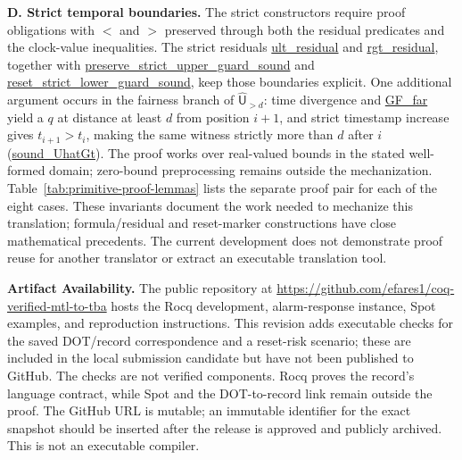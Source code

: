 \documentclass[10pt,journal,compsoc]{IEEEtran}
\newcommand{\hUntil}{\mathbin{\widehat{\mathsf{U}}}}
\newcommand{\runinhead}[1]{\par\smallskip\noindent\textbf{#1}\enspace}
\newcommand{\Rocqid}[1]{{\small\url{#1}}}
\begin{document}
\runinhead{D. Strict temporal boundaries.}
The strict constructors require proof obligations with $<$ and $>$ preserved
through both the residual predicates and the clock-value inequalities. The
strict residuals \Rocqid{ult_residual} and \Rocqid{rgt_residual}, together
with \Rocqid{preserve_strict_upper_guard_sound} and
\Rocqid{reset_strict_lower_guard_sound}, keep those boundaries explicit.
One additional argument occurs in the fairness branch of $\hUntil_{>d}$:
time divergence and \Rocqid{GF_far} yield a $q$ at distance at least $d$
from position $i+1$, and strict timestamp increase gives $t_{i+1}>t_i$,
making the same witness strictly more than $d$ after $i$
(\Rocqid{sound_UhatGt}). The proof works
over real-valued bounds in the stated well-formed domain; zero-bound
preprocessing remains outside the mechanization. Table~\ref{tab:primitive-proof-lemmas}
lists the separate proof pair for each of the eight cases. These invariants
document the work needed to mechanize this translation; formula/residual and
reset-marker constructions have close mathematical precedents. The current
development does not demonstrate proof reuse for another translator or
extract an executable translation tool.

\begingroup
\raggedright
\runinhead{Artifact Availability.}
The public repository at
\url{https://github.com/efares1/coq-verified-mtl-to-tba} hosts the Rocq
development, alarm-response instance, Spot examples, and reproduction
instructions. This revision adds executable checks for the saved DOT/record
correspondence and a reset-risk scenario; these are included in the local
submission candidate but have not been published to GitHub. The checks are not
verified components. Rocq proves the record's language contract, while Spot
and the DOT-to-record link remain outside the proof. The GitHub URL is mutable;
an immutable identifier for the exact snapshot should be inserted after the
release is approved and publicly archived. This is not an executable compiler.
\par
\endgroup
\end{document}

